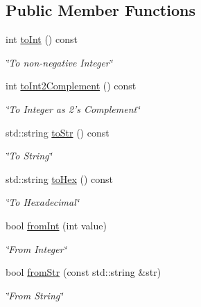 \subsection*{Public Member Functions}
\begin{DoxyCompactItemize}
\item 
int \hyperlink{classWord_a19303d963626549830a8da33d863bd6d}{toInt} () const 
\begin{DoxyCompactList}\small\item\em \char`\"{}To non-\/negative Integer\char`\"{} \item\end{DoxyCompactList}\item 
int \hyperlink{classWord_a3d771d68afd4a70d279af8bd9cd6bef9}{toInt2Complement} () const 
\begin{DoxyCompactList}\small\item\em \char`\"{}To Integer as 2's Complement\char`\"{} \item\end{DoxyCompactList}\item 
std::string \hyperlink{classWord_ac2ca49ef4da2fb57172fe057849e53fa}{toStr} () const 
\begin{DoxyCompactList}\small\item\em \char`\"{}To String\char`\"{} \item\end{DoxyCompactList}\item 
std::string \hyperlink{classWord_ab797467868642bb096bc4c9b1ed0a2f0}{toHex} () const 
\begin{DoxyCompactList}\small\item\em \char`\"{}To Hexadecimal\char`\"{} \item\end{DoxyCompactList}\item 
bool \hyperlink{classWord_ac5f869d82c443a5c39f0d4a295b61d35}{fromInt} (int value)
\begin{DoxyCompactList}\small\item\em \char`\"{}From Integer\char`\"{} \item\end{DoxyCompactList}\item 
bool \hyperlink{classWord_a56fb0f409b1610afd30492e848c95825}{fromStr} (const std::string \&str)
\begin{DoxyCompactList}\small\item\em \char`\"{}From String\char`\"{} \item\end{DoxyCompactList}\item 

\end{DoxyCompactItemize}
